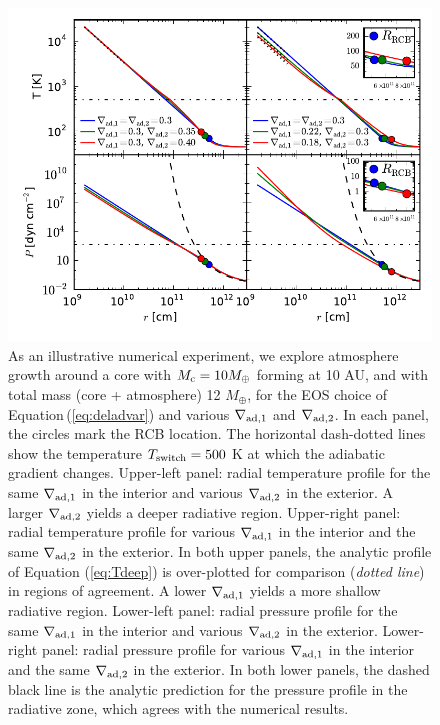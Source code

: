 \documentclass[apj]{emulateapj}
\newcommand{\Eq}[1]{Equation\,(\ref{#1})}
\newcommand{\co}{_{\rm c}}
\begin{document}
\begin{figure}[tb]
\centering
\includegraphics[width=\textwidth]{../../figs/ModelAtmospheres/RadSelfGravRealEOS/PaperFigs/varying_delad_4panel_3.pdf}
\caption{As an illustrative numerical experiment, we explore atmosphere growth around a core with $M\co=10 M_{\oplus}$ forming at 10 AU, and with total mass (core + atmosphere) 12 $M_{\oplus}$, for the EOS choice of \Eq{eq:deladvar} and various $\nabla_{\rm ad,1}$ and $\nabla_{\rm ad,2}$. In each panel, the circles mark the RCB location. The horizontal dash-dotted lines show the temperature $T_{\rm switch}=500$ K at which the adiabatic gradient changes. Upper-left panel: radial temperature profile for the same $\nabla_{\rm ad,1}$ in the interior and various $\nabla_{\rm ad,2}$ in the exterior.  A larger $\nabla_{\rm ad,2}$ yields a deeper radiative region. Upper-right panel: radial temperature profile for various $\nabla_{\rm ad,1}$ in the interior and the same $\nabla_{\rm ad,2}$ in the exterior. In both upper panels, the analytic profile of Equation (\ref{eq:Tdeep}) is over-plotted for comparison (\textit{dotted line}) in regions of agreement. A lower $\nabla_{\rm ad,1}$ yields a more shallow radiative region.  Lower-left panel: radial pressure profile for the same $\nabla_{\rm ad,1}$ in the interior and various $\nabla_{\rm ad,2}$ in the exterior.  Lower-right panel: radial pressure profile for various $\nabla_{\rm ad,1}$ in the interior and the same $\nabla_{\rm ad,2}$ in the exterior. In both lower panels, the dashed black line is the analytic prediction for the pressure profile in the radiative zone, which agrees with the numerical results.}
\label{fig:varying_delad}
\end{figure}
\end{document}
